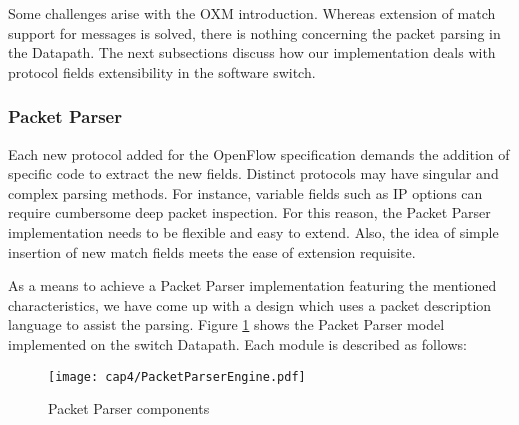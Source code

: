 Some challenges arise with the OXM introduction. Whereas extension of match support for messages is solved, there is nothing concerning the packet parsing in the Datapath. The next subsections discuss how our implementation deals with protocol fields extensibility in the software switch. 

    \subsubsection{Packet Parser}
    \label{pktparser}

    Each new protocol added for the OpenFlow specification demands the addition of specific code to extract the new fields. Distinct protocols may have singular and complex parsing methods. For instance, variable fields such as IP options can require cumbersome deep packet inspection. For this reason, the Packet Parser implementation needs to be flexible and easy to extend. Also, the idea of simple insertion of new match fields meets the ease of extension requisite.    
    
    As a means to achieve a Packet Parser implementation featuring the mentioned characteristics, we have come up with a design which uses a packet description language to assist the parsing. Figure \ref{fig:netbee} shows the Packet Parser model implemented on the switch Datapath. Each module is described as follows:
    
    \begin{figure}[h]
    \centering
    \texttt{[image: cap4/PacketParserEngine.pdf]}
    \caption{Packet Parser components}
    \label{fig:netbee}
    \end{figure}
    
